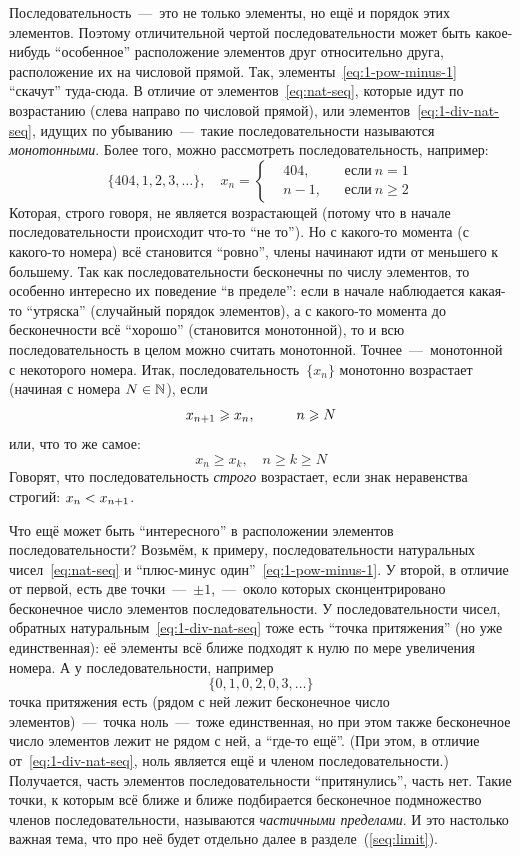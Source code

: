 \documentclass[a4paper,12pt]{article}
\begin{document}
  Последовательность~---~это не только элементы, но ещё и порядок этих элементов.
  Поэтому отличительной чертой последовательности может быть какое-нибудь ``особенное'' расположение элементов друг относительно друга, расположение их на числовой прямой.
  Так, элементы~\eqref{eq:1-pow-minus-1} ``скачут'' туда-сюда.
  В отличие от элементов~\eqref{eq:nat-seq}, которые идут по возрастанию (слева направо по числовой прямой), или элементов~\eqref{eq:1-div-nat-seq}, идущих по убыванию~---~такие последовательности называются \emph{монотонными}.
  Более того, можно рассмотреть последовательность, например:
  \[
    \{404, 1, 2, 3, \ldots\},\quad x_n = \left\{
      \begin{aligned}
        &404, & &\mbox{если}\ n = 1\\
        &n - 1, & &\mbox{если}\ n \geq 2
      \end{aligned}
    \right.
  \]
  Которая, строго говоря, не является возрастающей (потому что в начале последовательности происходит что-то ``не то'').
  Но с какого-то момента (с какого-то номера) всё становится ``ровно'', члены начинают идти от меньшего к большему.
  Так как последовательности бесконечны по числу элементов, то особенно интересно их поведение ``в пределе'': если в начале наблюдается какая-то ``утряска'' (случайный порядок элементов), а с какого-то момента до бесконечности всё ``хорошо'' (становится монотонной), то и всю последовательность в целом можно считать монотонной.
  Точнее~---~монотонной с некоторого номера.
  Итак, последовательность~$\{x_n\}$ монотонно возрастает (начиная с номера $N \hm\in \NN$), если
  \[
    x_{n + 1} \geq x_n,\quad \hphantom{n \geq {}} n \geq N
  \]
  или, что то же самое:
  \[
    x_n \geq x_k,\quad n \geq k \geq N
  \]
  Говорят, что последовательность \emph{строго} возрастает, если знак неравенства строгий: $x_n \hm< x_{n + 1}$.
  
  Что ещё может быть ``интересного'' в расположении элементов последовательности?
  Возьмём, к примеру, последовательности натуральных чисел~\eqref{eq:nat-seq} и ``плюс-минус один''~\eqref{eq:1-pow-minus-1}.
  У второй, в отличие от первой, есть две точки~---~$\pm 1$,~---~около которых сконцентрировано бесконечное число элементов последовательности.
  У последовательности чисел, обратных натуральным~\eqref{eq:1-div-nat-seq} тоже есть ``точка притяжения'' (но уже единственная): её элементы всё ближе подходят к нулю по мере увеличения номера.
  А у последовательности, например
  \[
    \{0, 1, 0, 2, 0, 3, \ldots\}
  \]
  точка притяжения есть (рядом с ней лежит бесконечное число элементов)~---~точка ноль~---~тоже единственная, но при этом также бесконечное число элементов лежит не рядом с ней, а ``где-то ещё''.
  (При этом, в отличие от~\eqref{eq:1-div-nat-seq}, ноль является ещё и членом последовательности.)
  Получается, часть элементов последовательности ``притянулись'', часть нет.
  Такие точки, к которым всё ближе и ближе подбирается бесконечное подмножество членов последовательности, называются \emph{частичными пределами}.
  И это настолько важная тема, что про неё будет отдельно далее в разделе~(\ref{seq:limit}).
  
\end{document}
